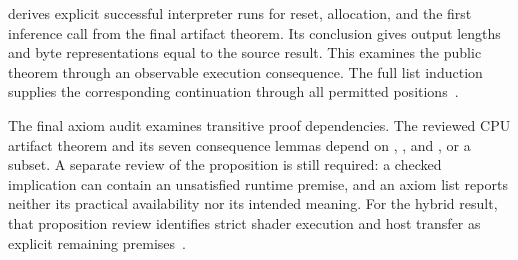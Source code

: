  derives explicit successful interpreter runs for reset, allocation, and the first inference call from the final artifact theorem.  Its conclusion gives output lengths and byte representations equal to the source result.  This examines the public theorem through an observable execution consequence.  The full list induction supplies the corresponding continuation through all permitted positions~\cite{reviewlemmas,session}.

The final axiom audit examines transitive proof dependencies.  The reviewed CPU artifact theorem and its seven consequence lemmas depend on , , and , or a subset.  A separate review of the proposition is still required: a checked implication can contain an unsatisfied runtime premise, and an axiom list reports neither its practical availability nor its intended meaning.  For the hybrid result, that proposition review identifies strict shader execution and host transfer as explicit remaining premises~\cite{review,wg-review}.

